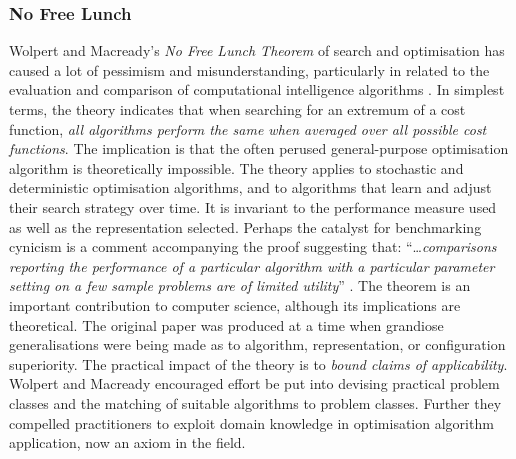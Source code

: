 %
%
\subsubsection{No Free Lunch}
Wolpert and Macready's \emph{No Free Lunch Theorem} of search and optimisation has caused a lot of pessimism and misunderstanding, particularly in related to the evaluation and comparison of computational intelligence algorithms \cite{Wolpert1997, Wolpert1995}. In simplest terms, the theory indicates that when searching for an extremum of a cost function, \emph{all algorithms perform the same when averaged over all possible cost functions}. The implication is that the often perused general-purpose optimisation algorithm is theoretically impossible. The theory applies to stochastic and deterministic optimisation algorithms, and to algorithms that learn and adjust their search strategy over time. It is invariant to the performance measure used as well as the representation selected. Perhaps the catalyst for benchmarking cynicism is a comment accompanying the proof suggesting that: ``\ldots \emph{comparisons reporting the performance of a particular algorithm with a particular parameter setting on a few sample problems are of limited utility}'' \cite{Wolpert1997}.
The theorem is an important contribution to computer science, although its implications are theoretical. The original paper was produced at a time when grandiose generalisations were being made as to algorithm, representation, or configuration superiority. The practical impact of the theory is to \emph{bound claims of applicability}. Wolpert and Macready encouraged effort be put into devising practical problem classes and the matching of suitable algorithms to problem classes. Further they compelled practitioners to exploit domain knowledge in optimisation algorithm application, now an axiom in the field. 

%
%
